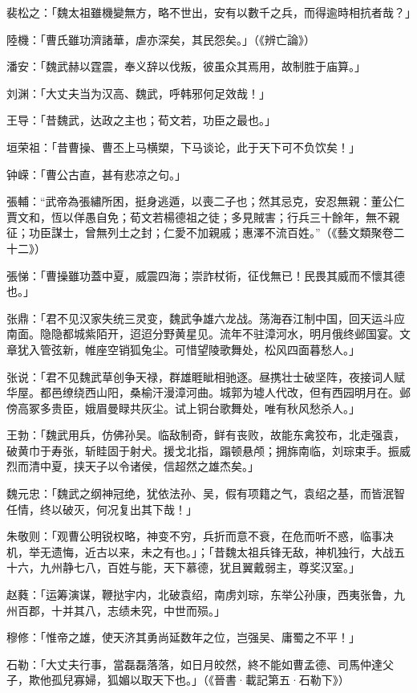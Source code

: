 裴松之：「魏太祖雖機變無方，略不世出，安有以數千之兵，而得逾時相抗者哉？」

陸機：「曹氏雖功濟諸華，虐亦深矣，其民怨矣。」（《辨亡論》）

潘安：「魏武赫以霆震，奉义辞以伐叛，彼虽众其焉用，故制胜于庙算。」

刘渊：「大丈夫当为汉高、魏武，呼韩邪何足效哉！」

王导：「昔魏武，达政之主也；荀文若，功臣之最也。」

垣荣祖：「昔曹操、曹丕上马横槊，下马谈论，此于天下可不负饮矣！」

钟嵘：「曹公古直，甚有悲凉之句。」

張輔：“武帝為張繡所困，挺身逃遁，以喪二子也；然其忌克，安忍無親：董公仁賈文和，恆以佯愚自免；荀文若楊德祖之徒；多見賊害；行兵三十餘年，無不親征；功臣謀士，曾無列土之封；仁愛不加親戚；惠澤不流百姓。”（《藝文類聚卷二十二》）

張悌：「曹操雖功蓋中夏，威震四海；崇詐杖術，征伐無已！民畏其威而不懷其德也。」

张鼎：「君不见汉家失统三灵变，魏武争雄六龙战。荡海吞江制中国，回天运斗应南面。隐隐都城紫陌开，迢迢分野黄星见。流年不驻漳河水，明月俄终邺国宴。文章犹入管弦新，帷座空销狐兔尘。可惜望陵歌舞处，松风四面暮愁人。」

张说：「君不见魏武草创争天禄，群雄睚眦相驰逐。昼携壮士破坚阵，夜接词人赋华屋。都邑缭绕西山阳，桑榆汗漫漳河曲。城郭为墟人代改，但有西园明月在。邺傍高冢多贵臣，娥眉曼睩共灰尘。试上铜台歌舞处，唯有秋风愁杀人。」

王勃：「魏武用兵，仿佛孙吴。临敌制奇，鲜有丧败，故能东禽狡布，北走强袁，破黄巾于寿张，斩眭固于射犬。援戈北指，蹋顿悬颅；拥旆南临，刘琮束手。振威烈而清中夏，挟天子以令诸侯，信超然之雄杰矣。」

魏元忠：「魏武之纲神冠绝，犹依法孙、吴，假有项籍之气，袁绍之基，而皆泯智任情，终以破灭，何况复出其下哉！」

朱敬则：「观曹公明锐权略，神变不穷，兵折而意不衰，在危而听不惑，临事决机，举无遗悔，近古以来，未之有也。」；「昔魏太祖兵锋无敌，神机独行，大战五十六，九州静七八，百姓与能，天下慕德，犹且翼戴弱主，尊奖汉室。」

赵蕤：「运筹演谋，鞭挞宇内，北破袁绍，南虏刘琮，东举公孙康，西夷张鲁，九州百郡，十并其八，志绩未究，中世而殒。」

穆修：「惟帝之雄，使天济其勇尚延数年之位，岂强吴、庸蜀之不平！」

石勒：「大丈夫行事，當磊磊落落，如日月皎然，終不能如曹孟德、司馬仲達父子，欺他孤兒寡婦，狐媚以取天下也。」（《晉書·載記第五·石勒下》）

